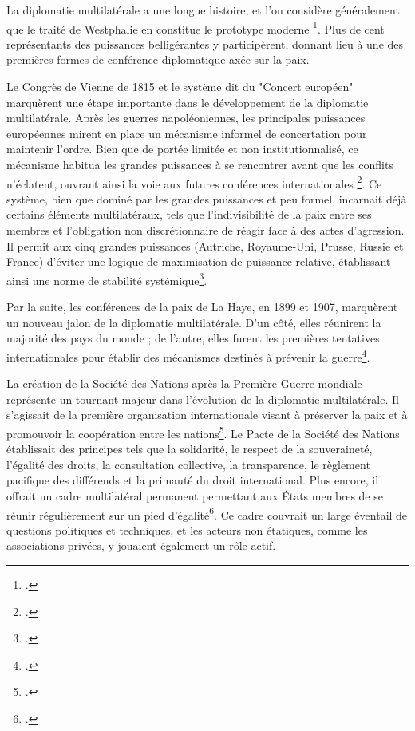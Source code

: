 \documentclass[a4paper,twoside,12pt]{book}
\begin{document}
La diplomatie multilatérale a une longue histoire, et l'on considère généralement que le traité de Westphalie en constitue le prototype moderne \footcite{chikvaidze2020}. Plus de cent représentants des puissances belligérantes y participèrent, donnant lieu à une des premières formes de conférence diplomatique axée sur la paix.

Le Congrès de Vienne de 1815 et le système dit du "Concert européen" marquèrent une étape importante dans le développement de la diplomatie multilatérale. Après les guerres napoléoniennes, les principales puissances européennes mirent en place un mécanisme informel de concertation pour maintenir l'ordre. Bien que de portée limitée et non institutionnalisé, ce mécanisme habitua les grandes puissances à se rencontrer avant que les conflits n'éclatent, ouvrant ainsi la voie aux futures conférences internationales \footcite{library}. Ce système, bien que dominé par les grandes puissances et peu formel, incarnait déjà certains éléments multilatéraux, tels que l'indivisibilité de la paix entre ses membres et l'obligation non discrétionnaire de réagir face à des actes d'agression. Il permit aux cinq grandes puissances (Autriche, Royaume-Uni, Prusse, Russie et France) d'éviter une logique de maximisation de puissance relative, établissant ainsi une norme de stabilité systémique\footcite[p.578-579]{ruggie1992}.

Par la suite, les conférences de la paix de La Haye, en 1899 et 1907, marquèrent un nouveau jalon de la diplomatie multilatérale. D'un côté, elles réunirent la majorité des pays du monde ; de l'autre, elles furent les premières tentatives internationales pour établir des mécanismes destinés à prévenir la guerre\footcite{library}.

La création de la Société des Nations après la Première Guerre mondiale représente un tournant majeur dans l'évolution de la diplomatie multilatérale. Il s'agissait de la première organisation internationale visant à préserver la paix et à promouvoir la coopération entre les nations\footcite{library}. Le Pacte de la Société des Nations établissait des principes tels que la solidarité, le respect de la souveraineté, l'égalité des droits, la consultation collective, la transparence, le règlement pacifique des différends et la primauté du droit international. Plus encore, il offrait un cadre multilatéral permanent permettant aux États membres de se réunir régulièrement sur un pied d'égalité\footcite{library}. Ce cadre couvrait un large éventail de questions politiques et techniques, et les acteurs non étatiques, comme les associations privées, y jouaient également un rôle actif.
\end{document}
